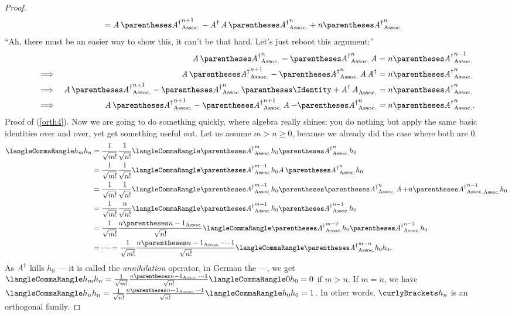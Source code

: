 \documentclass[10pt, a4paper, twoside]{lecturenotes}
\newcommand{\opAdag}{\adj{\opA}}
\begin{document}
\begin{lecture}[date=2013-03-28]
\begin{proposition}
\begin{proof}
\begin{align*}
  &= \opA \pa{\opAdag}^{n+1} - \opAdag \opA \pa{\opAdag}^n + n \pa{\opAdag}^n
\end{align*}
  ``Ah, there must be an easier way to show this, it can't be that hard. Let's just reboot this argument:''
\begin{alignat*}{2}
&& \opA\pa{\opAdag}^n - \pa{\opAdag}^n\opA &= n \pa{\opAdag}^{n-1}\\
\Implies&& \opA\pa{\opAdag}^{n+1} - \pa{\opAdag}^n \opA \opAdag &= n \pa{\opAdag}^n \\
\Implies&& \opA \pa{\opAdag}^{n+1} - \pa{\opAdag}^n \pa{\Identity + \opAdag\opA}&= n \pa{\opAdag}^n \\
\Implies&& \opA \pa{\opAdag}^{n+1} - \pa{\opAdag}^{n+1} \opA - \pa{\opAdag}^{n} &= n \pa{\opAdag}^n \text.
\end{alignat*}
Proof of (\ref{orth4}). Now we are going to do something quickly, where algebra really shines: you do nothing but apply the same basic identities over and over, yet get something useful out. Let us assume $m>n\geq 0$, because we already did the case where both are $0$.
\begin{align*}
\LTwoInner{h_m}{h_n} &= \frac{1}{\sqrt{\Factorial m}} \frac{1}{\sqrt{\Factorial n}} \LTwoInner{\pa{\opAdag}^{m} h_0}{\pa{\opAdag}^{n} h_0} \\
&= \frac{1}{\sqrt{\Factorial m}} \frac{1}{\sqrt{\Factorial n}}\LTwoInner{\pa{\opAdag}^{m-1} h_0}{\opA\pa{\opAdag}^{n} h_0}\\
&= \frac{1}{\sqrt{\Factorial m}} \frac{1}{\sqrt{\Factorial n}}\LTwoInner{\pa{\opAdag}^{m-1} h_0}{\pa{\pa{\opAdag}^{n}\opA + n\pa{\opAdag}^{n-1}} h_0 }\\
&= \frac{1}{\sqrt{\Factorial m}} \frac{n}{\sqrt{\Factorial n}} 
  \LTwoInner{\pa{\opAdag}^{m-1} h_0}{\pa{\opAdag}^{n-1} h_0}\\
&= \frac{1}{\sqrt{\Factorial m}} 
  \frac{n\pa{n-1}}{\sqrt{\Factorial n}} 
  \LTwoInner{\pa{\opAdag}^{m-2} h_0}{\pa{\opAdag}^{n-2} h_0}\\
  &= \dotsb = \frac{1}{\sqrt{\Factorial m}} 
  \frac{n\pa{n-1}\dotsm 1}{\sqrt{\Factorial n}} 
  \LTwoInner{\pa{\opAdag}^{m-n} h_0}{h_0}\text.
\end{align*}
As $\opAdag$ kills $h_0$ --- it is called the \emph{annihilation} operator, in German the  ---, we get $
  \LTwoInner{h_m}{h_n} =
  \frac{1}{\sqrt{\Factorial m}} 
  \frac{n\pa{n-1}\dotsm 1}{\sqrt{\Factorial n}} 
  \LTwoInner{0}{h_0}=0$ if $m>n$. If $m=n$, we have $
  \LTwoInner{h_n}{h_n} =
  \frac{1}{\sqrt{\Factorial n}} 
  \frac{n\pa{n-1}\dotsm 1}{\sqrt{\Factorial n}} 
  \LTwoInner{h_0}{h_0}=1$.  
  In other words, $\set{h_n}$ is an orthogonal family.


\end{proof}
\end{proposition}
\end{lecture}
\end{document}

